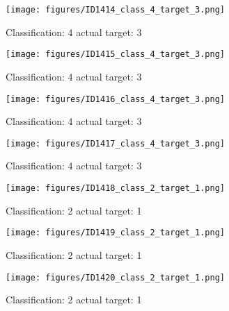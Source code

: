 \begin{figure}[h!]
\begin{center}
\texttt{[image: figures/ID1414\_class\_4\_target\_3.png]}
\end{center}
\caption{ Classification: 4 actual target: 3}
\label{fig:ID1414_class_4_target_3}
\end{figure}
\begin{figure}[h!]
\begin{center}
\texttt{[image: figures/ID1415\_class\_4\_target\_3.png]}
\end{center}
\caption{ Classification: 4 actual target: 3}
\label{fig:ID1415_class_4_target_3}
\end{figure}
\begin{figure}[h!]
\begin{center}
\texttt{[image: figures/ID1416\_class\_4\_target\_3.png]}
\end{center}
\caption{ Classification: 4 actual target: 3}
\label{fig:ID1416_class_4_target_3}
\end{figure}
\begin{figure}[h!]
\begin{center}
\texttt{[image: figures/ID1417\_class\_4\_target\_3.png]}
\end{center}
\caption{ Classification: 4 actual target: 3}
\label{fig:ID1417_class_4_target_3}
\end{figure}
\begin{figure}[h!]
\begin{center}
\texttt{[image: figures/ID1418\_class\_2\_target\_1.png]}
\end{center}
\caption{ Classification: 2 actual target: 1}
\label{fig:ID1418_class_2_target_1}
\end{figure}
\begin{figure}[h!]
\begin{center}
\texttt{[image: figures/ID1419\_class\_2\_target\_1.png]}
\end{center}
\caption{ Classification: 2 actual target: 1}
\label{fig:ID1419_class_2_target_1}
\end{figure}
\begin{figure}[h!]
\begin{center}
\texttt{[image: figures/ID1420\_class\_2\_target\_1.png]}
\end{center}
\caption{ Classification: 2 actual target: 1}
\label{fig:ID1420_class_2_target_1}
\end{figure}
